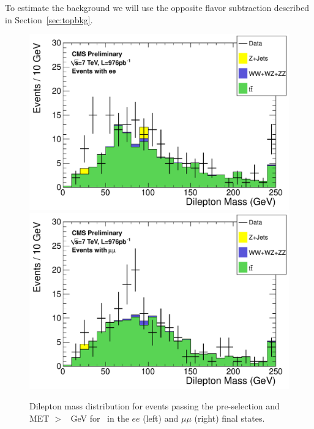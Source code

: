 
To estimate the \ttbar background we will use the opposite flavor subtraction
described in Section~\ref{sec:topbkg}.


\begin{figure}[hbt]
  \begin{center}
	\includegraphics[width=0.48\linewidth]{plots/hdilmass_pfmet100_ee_allj.pdf}
	\includegraphics[width=0.48\linewidth]{plots/hdilmass_pfmet100_mm_allj.pdf}
	\caption{
	  \label{fig:dilmass100}\protect 
	  Dilepton mass distribution for events passing the pre-selection 
	  and MET $>$ \signalmetl~GeV for \lumi\ in the $ee$ (left) and $\mu\mu$ (right) final states. 
	}
  \end{center}
\end{figure}


